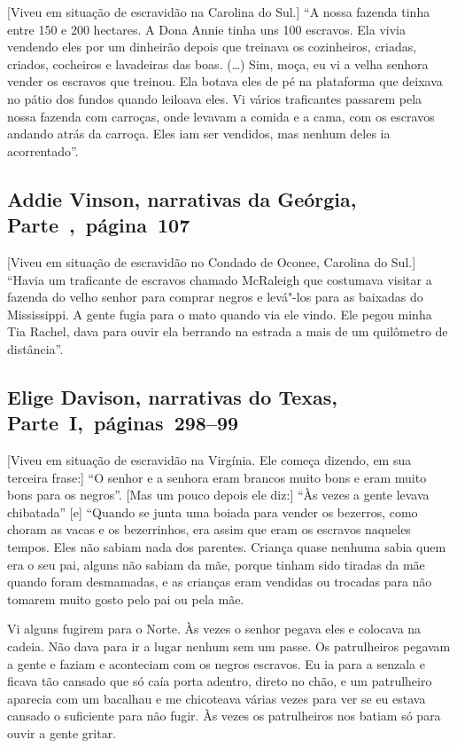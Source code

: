 [Viveu em situação de escravidão na Carolina do Sul.] ``A nossa fazenda tinha entre 150 e 200 hectares. A Dona Annie tinha uns 100 escravos. Ela vivia vendendo eles por um dinheirão depois que
treinava os cozinheiros, criadas, criados, cocheiros e lavadeiras das
boas. (\ldots{}) Sim, moça, eu vi a velha senhora vender os escravos que
treinou. Ela botava eles de pé na plataforma que deixava no pátio dos
fundos quando leiloava eles. Vi vários traficantes passarem pela nossa
fazenda com carroças, onde levavam a comida e a cama, com os escravos
andando atrás da carroça. Eles iam ser vendidos, mas nenhum deles ia
acorrentado''.

\subsection{Addie Vinson, narrativas da Geórgia, Parte~,~página~107}
\label{ref268}

{[}Viveu em situação de escravidão no Condado de Oconee, Carolina do Sul.{]} ``Havia um traficante de escravos chamado McRaleigh que costumava
visitar a fazenda do velho senhor para comprar negros e levá"-los para as
baixadas do Mississippi. A gente fugia para o mato quando via ele vindo.
Ele pegou minha Tia Rachel, dava para ouvir ela berrando na estrada a
mais de um quilômetro de distância''.

\subsection{Elige Davison, narrativas do Texas, Parte~I,~páginas~298--99}

{[}Viveu em situação de escravidão na Virgínia. Ele começa dizendo, em sua terceira frase:{]} ``O senhor e a senhora
eram brancos muito bons e eram muito bons para os negros''. {[}Mas um
pouco depois ele diz:{]} ``Às vezes a gente levava chibatada'' {[}e{]}
``Quando se junta uma boiada para vender os bezerros, como choram as
vacas e os bezerrinhos, era assim que eram os escravos naqueles tempos.
Eles não sabiam nada dos parentes. Criança quase nenhuma sabia quem era
o seu pai, alguns não sabiam da mãe, porque tinham sido tiradas da mãe
quando foram desmamadas, e as crianças eram vendidas ou trocadas para
não tomarem muito gosto pelo pai ou pela mãe.

Vi alguns fugirem para o Norte. Às vezes o senhor pegava eles e colocava
na cadeia. Não dava para ir a lugar nenhum sem um passe. Os patrulheiros
pegavam a gente e faziam e aconteciam com os negros escravos. Eu ia para %
a senzala e ficava tão cansado que só caía porta adentro, direto no
chão, e um patrulheiro aparecia com um bacalhau e me chicoteava várias
vezes para ver se eu estava cansado o suficiente para não fugir. Às
vezes os patrulheiros nos batiam só para ouvir a gente gritar.

